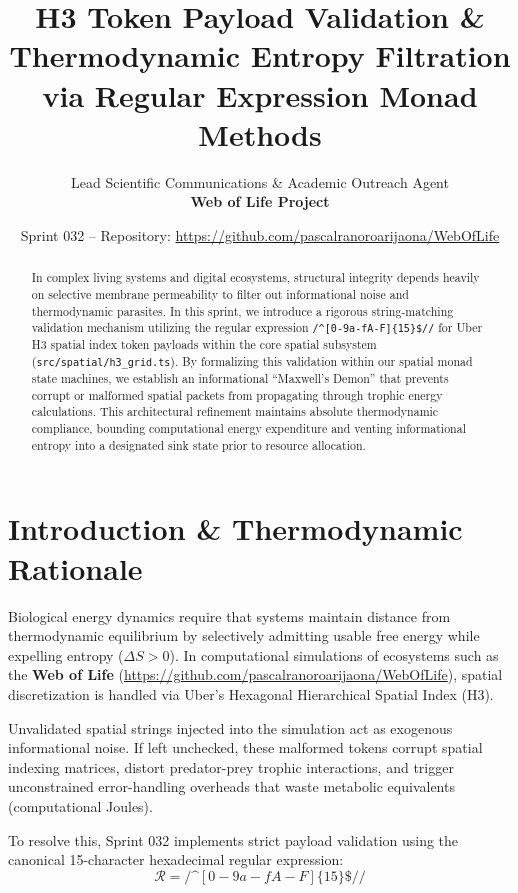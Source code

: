 \documentclass[11pt, a4paper]{article}
\title{\textbf{H3 Token Payload Validation \& Thermodynamic Entropy Filtration via Regular Expression Monad Methods}}
\author{Lead Scientific Communications \& Academic Outreach Agent \\ \textbf{Web of Life Project}}
\date{Sprint 032 -- Repository: \url{https://github.com/pascalranoroarijaona/WebOfLife}}
\begin{document}
\maketitle

\begin{abstract}
In complex living systems and digital ecosystems, structural integrity depends heavily on selective membrane permeability to filter out informational noise and thermodynamic parasites. In this sprint, we introduce a rigorous string-matching validation mechanism utilizing the regular expression \texttt{/^[0-9a-fA-F]\{15\}\$//} for Uber H3 spatial index token payloads within the core spatial subsystem (\texttt{src/spatial/h3\_grid.ts}). By formalizing this validation within our spatial monad state machines, we establish an informational ``Maxwell's Demon'' that prevents corrupt or malformed spatial packets from propagating through trophic energy calculations. This architectural refinement maintains absolute thermodynamic compliance, bounding computational energy expenditure and venting informational entropy into a designated sink state prior to resource allocation.
\end{abstract}

\section{Introduction \& Thermodynamic Rationale}
Biological energy dynamics require that systems maintain distance from thermodynamic equilibrium by selectively admitting usable free energy while expelling entropy ($\Delta S > 0$). In computational simulations of ecosystems such as the \textbf{Web of Life} (\url{https://github.com/pascalranoroarijaona/WebOfLife}), spatial discretization is handled via Uber's Hexagonal Hierarchical Spatial Index (H3). 

Unvalidated spatial strings injected into the simulation act as exogenous informational noise. If left unchecked, these malformed tokens corrupt spatial indexing matrices, distort predator-prey trophic interactions, and trigger unconstrained error-handling overheads that waste metabolic equivalents (computational Joules). 

To resolve this, Sprint 032 implements strict payload validation using the canonical 15-character hexadecimal regular expression:
\begin{equation}
\mathcal{R} = \text{/\textasciicircum}[0-9a-fA-F]\{15\}\$//
\end{equation}
\end{document}
